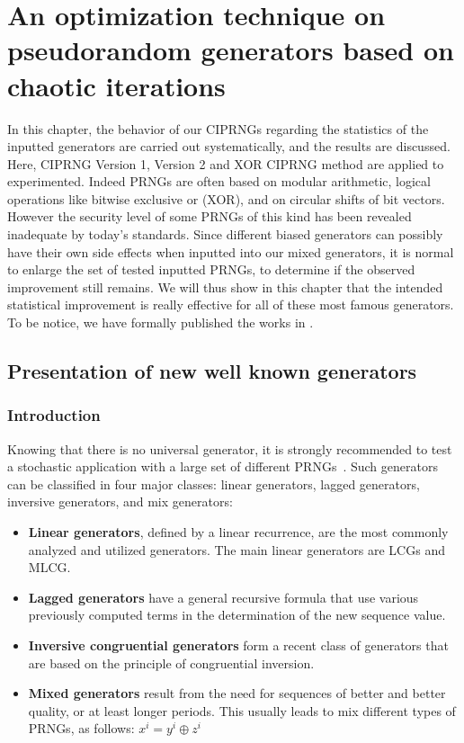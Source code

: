 \chapter{An optimization technique on pseudorandom generators based on chaotic iterations}
\minitoc
\label{An optimization technique on pseudorandom generators based on chaotic iterations}

In this chapter, the behavior of our CIPRNGs regarding 
the statistics of the inputted generators are carried out systematically, and the results are discussed.
Here, CIPRNG Version 1, Version 2 and XOR CIPRNG method are applied to experimented.
Indeed PRNGs are often based on modular arithmetic, logical operations like bitwise exclusive or (XOR), and on circular shifts of
bit vectors.
However the security level of some PRNGs of this kind has been revealed inadequate by today's standards.
Since different biased generators can possibly have their own side effects when inputted into our mixed generators, it is normal to enlarge the set of tested inputted PRNGs, to determine if the observed improvement still remains.
We will thus show in this chapter that the intended statistical improvement is really effective for all of these most famous generators. To be notice, we have formally published the works in \cite{bfg12a:ip}.



\section{Presentation of new well known generators}
\label{The generation of pseudo-random sequence}

\subsection{Introduction}

Knowing that there is no universal generator, it is strongly recommended to test a stochastic application with a large set of different PRNGs~\cite{DavidRC2003643}. Such 
generators can be classified in four major classes: linear generators, lagged generators, inversive generators, and mix generators:
\begin{itemize}
 \item \textbf{Linear generators}, defined by a linear recurrence, are the most commonly analyzed and utilized generators. The main linear generators are LCGs and MLCG.
 \item \textbf{Lagged generators} have a general recursive formula that use various previously computed terms in the determination of the new sequence value.
 \item \textbf{Inversive congruential generators} form a recent class of generators that are based on the principle of congruential inversion.
 \item \textbf{Mixed generators} result from the need for sequences of better and better quality, or at least longer periods. This usually leads to mix different types of PRNGs, as follows: $x^i=y^i\oplus z^i$
\end{itemize}


